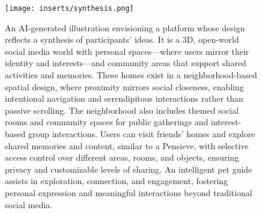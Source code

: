 \begin{figure}[t]
    \centering
    \texttt{[image: inserts/synthesis.png]}
    \caption{An AI-generated illustration envisioning a platform whose design reflects a synthesis of participants' ideas. It is a 3D, open-world social media world with personal spaces---where users mirror their identity and interests---and community areas that support shared activities and memories. These homes exist in a neighborhood-based spatial design, where proximity mirrors social closeness, enabling intentional navigation and serendipitous interactions rather than passive scrolling. The neighborhood also includes themed social rooms and community spaces for public gatherings and interest-based group interactions. Users can visit friends' homes and explore shared memories and content, similar to a Pensieve, with selective access control over different areas, rooms, and objects, ensuring privacy and customizable levels of sharing. An intelligent pet guide assists in exploration, connection, and engagement, fostering personal expression and meaningful interactions beyond traditional social media.}
    \label{fig:synthesis}
\end{figure}

